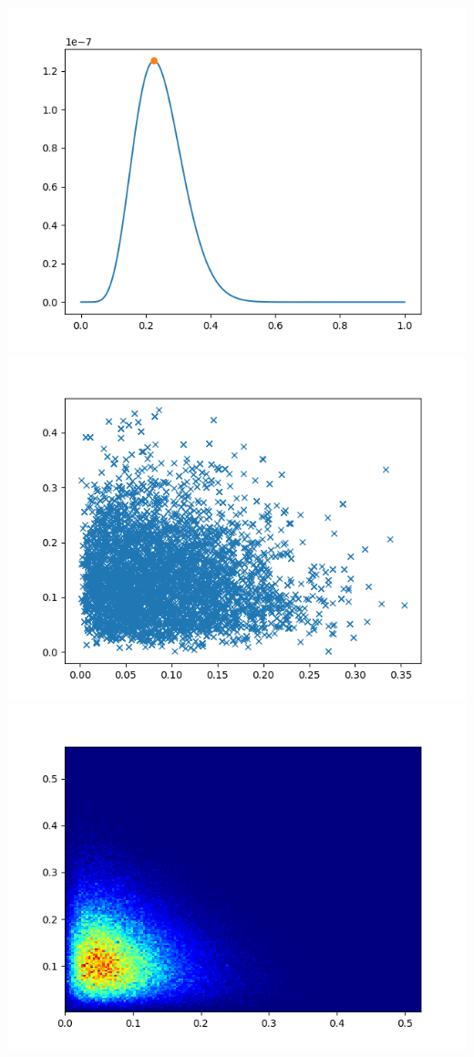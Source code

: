 \documentclass[pt12]{article}
\begin{document}
\begin{center}
\includegraphics[scale=0.5]{hip1.png}\\
\includegraphics[scale=0.5]{sc1.png}\\
\includegraphics[scale=0.5]{den1.png}\\
\end{center}
\end{document}
